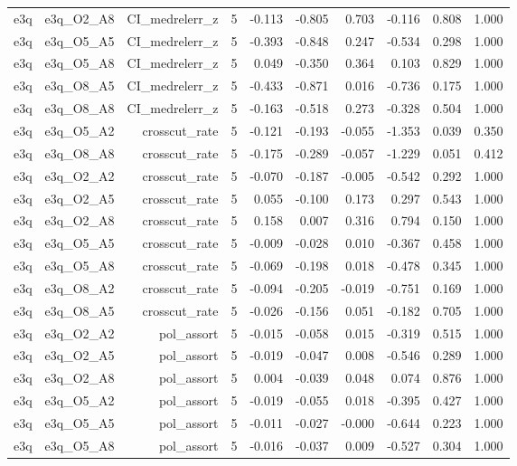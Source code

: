 \documentclass[11pt]{article}
\begin{document}
\begin{landscape}
\begin{longtable}{@{}lrrrrrrrrr@{}}
e3q & e3q\_O2\_A8 & CI\_medrelerr\_z & 5 & -0.113 & -0.805 & 0.703 & -0.116 & 0.808 & 1.000 \\
e3q & e3q\_O5\_A5 & CI\_medrelerr\_z & 5 & -0.393 & -0.848 & 0.247 & -0.534 & 0.298 & 1.000 \\
e3q & e3q\_O5\_A8 & CI\_medrelerr\_z & 5 & 0.049 & -0.350 & 0.364 & 0.103 & 0.829 & 1.000 \\
e3q & e3q\_O8\_A5 & CI\_medrelerr\_z & 5 & -0.433 & -0.871 & 0.016 & -0.736 & 0.175 & 1.000 \\
e3q & e3q\_O8\_A8 & CI\_medrelerr\_z & 5 & -0.163 & -0.518 & 0.273 & -0.328 & 0.504 & 1.000 \\
e3q & e3q\_O5\_A2 & crosscut\_rate & 5 & -0.121 & -0.193 & -0.055 & -1.353 & 0.039 & 0.350 \\
e3q & e3q\_O8\_A8 & crosscut\_rate & 5 & -0.175 & -0.289 & -0.057 & -1.229 & 0.051 & 0.412 \\
e3q & e3q\_O2\_A2 & crosscut\_rate & 5 & -0.070 & -0.187 & -0.005 & -0.542 & 0.292 & 1.000 \\
e3q & e3q\_O2\_A5 & crosscut\_rate & 5 & 0.055 & -0.100 & 0.173 & 0.297 & 0.543 & 1.000 \\
e3q & e3q\_O2\_A8 & crosscut\_rate & 5 & 0.158 & 0.007 & 0.316 & 0.794 & 0.150 & 1.000 \\
e3q & e3q\_O5\_A5 & crosscut\_rate & 5 & -0.009 & -0.028 & 0.010 & -0.367 & 0.458 & 1.000 \\
e3q & e3q\_O5\_A8 & crosscut\_rate & 5 & -0.069 & -0.198 & 0.018 & -0.478 & 0.345 & 1.000 \\
e3q & e3q\_O8\_A2 & crosscut\_rate & 5 & -0.094 & -0.205 & -0.019 & -0.751 & 0.169 & 1.000 \\
e3q & e3q\_O8\_A5 & crosscut\_rate & 5 & -0.026 & -0.156 & 0.051 & -0.182 & 0.705 & 1.000 \\
e3q & e3q\_O2\_A2 & pol\_assort & 5 & -0.015 & -0.058 & 0.015 & -0.319 & 0.515 & 1.000 \\
e3q & e3q\_O2\_A5 & pol\_assort & 5 & -0.019 & -0.047 & 0.008 & -0.546 & 0.289 & 1.000 \\
e3q & e3q\_O2\_A8 & pol\_assort & 5 & 0.004 & -0.039 & 0.048 & 0.074 & 0.876 & 1.000 \\
e3q & e3q\_O5\_A2 & pol\_assort & 5 & -0.019 & -0.055 & 0.018 & -0.395 & 0.427 & 1.000 \\
e3q & e3q\_O5\_A5 & pol\_assort & 5 & -0.011 & -0.027 & -0.000 & -0.644 & 0.223 & 1.000 \\
e3q & e3q\_O5\_A8 & pol\_assort & 5 & -0.016 & -0.037 & 0.009 & -0.527 & 0.304 & 1.000 \\

\end{longtable}
\end{landscape}
\end{document}
